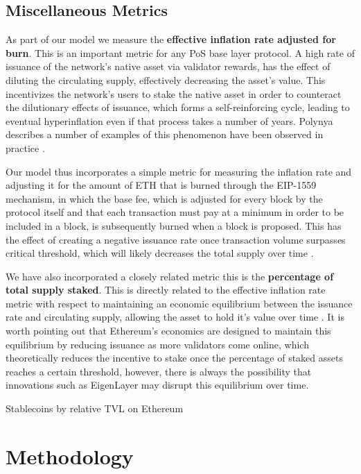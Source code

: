 \documentclass[conference]{IEEEtran}
\begin{document}
\subsection{Miscellaneous Metrics}

As part of our model we measure the \textbf{effective inflation rate adjusted for burn}.  This is an important metric for any PoS base layer protocol.  A high rate of issuance of the network's native asset via validator rewards, has the effect of diluting the circulating supply, effectively decreasing the asset's value.  This incentivizes the network's users to stake the native asset in order to counteract the dilutionary effects of issuance, which forms a self-reinforcing cycle, leading to eventual hyperinflation even if that process takes a number of years.  Polynya describes a number of examples of this phenomenon have been observed in practice \cite{polynya2022}. 

Our model thus incorporates a simple metric for measuring the inflation rate and adjusting it for the amount of ETH that is burned through the EIP-1559 mechanism, in which the base fee, which is adjusted for every block by the protocol itself and that each transaction must pay at a minimum in order to be included in a block, is subsequently burned when a block is proposed.  This has the effect of  creating a negative issuance rate once transaction volume surpasses critical threshold, which will likely decreases the total supply over time \cite{liu2022empirical}.

We have also incorporated a closely related metric this is the \textbf{percentage of total supply staked}.  This is directly related to the effective inflation rate metric with respect to maintaining an economic equilibrium between the issuance rate and circulating supply, allowing the asset to hold it's value over time \cite{john2021equilibrium}.  It is worth pointing out that Ethereum's economics are designed to maintain this equilibrium by reducing issuance as more validators come online, which theoretically reduces the incentive to stake once the percentage of staked assets reaches a certain threshold, however, there is always the possibility that innovations such as EigenLayer may disrupt this equilibrium over time.

Stablecoins by relative TVL on Ethereum

\section*{Methodology}
\end{document}
